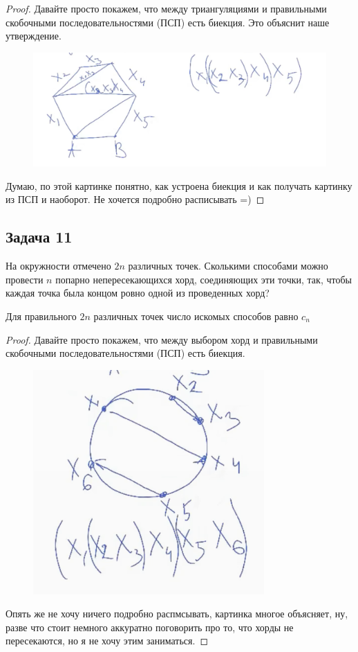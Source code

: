 \begin{proof}
    Давайте просто покажем, что между триангуляциями и правильными скобочными последовательностями (ПСП) есть биекция. Это объяснит наше утверждение. 

    \begin{figure}[H]
        \centering
        \includegraphics[width=1\linewidth]{Figures/sem05_task10.png}
    \end{figure}

    Думаю, по этой картинке понятно, как устроена биекция и как получать картинку из ПСП и наоборот. Не хочется подробно расписывать =)
\end{proof}

\subsection{Задача 11}
На окружности отмечено $2n$ различных точек. Сколькими способами можно провести
$n$ попарно непересекающихся хорд, соединяющих эти точки, так, чтобы каждая точка
была концом ровно одной из проведенных хорд?

\begin{claim*} 
Для правильного $2n$ различных точек число искомых способов равно $c_n$
\end{claim*}

\begin{proof}
Давайте просто покажем, что между выбором хорд и правильными скобочными последовательностями (ПСП) есть биекция.

\begin{figure}[H]
    \centering
    \includegraphics[width=0.5\linewidth]{Figures/sem05_task11.png}
\end{figure}
Опять же не хочу ничего подробно распмсывать, картинка многое объясняет, ну, разве что стоит немного аккуратно поговорить про то, что хорды не пересекаются, но я не хочу этим заниматься. 
\end{proof}